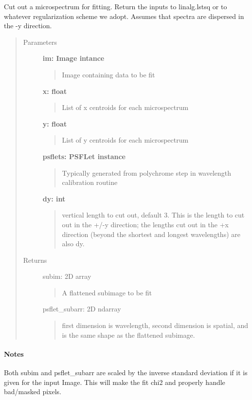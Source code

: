 \documentclass[letterpaper,10pt,english]{sphinxmanual}
\begin{document}
\begin{fulllineitems}
\label{tools:tools.reduction.get_cutout}
Cut out a microspectrum for fitting.  Return the inputs to 
linalg.lstsq or to whatever regularization scheme we adopt.
Assumes that spectra are dispersed in the -y direction.
\begin{quote}\begin{description}
\item[{Parameters}] \leavevmode
\textbf{im: Image intance}
\begin{quote}

Image containing data to be fit
\end{quote}

\textbf{x: float}
\begin{quote}

List of x centroids for each microspectrum
\end{quote}

\textbf{y: float}
\begin{quote}

List of y centroids for each microspectrum
\end{quote}

\textbf{psflets: PSFLet instance}
\begin{quote}

Typically generated from polychrome step in wavelength calibration routine
\end{quote}

\textbf{dy: int}
\begin{quote}

vertical length to cut out, default 3.  This is the length to cut out in the
+/-y direction; the lengths cut out in the +x direction (beyond the shortest 
and longest wavelengths) are also dy.
\end{quote}

\item[{Returns}] \leavevmode
subim:  2D array
\begin{quote}

A flattened subimage to be fit
\end{quote}

psflet\_subarr: 2D ndarray
\begin{quote}

first dimension is wavelength, second dimension is spatial, and is the same 
shape as the flattened subimage.
\end{quote}

\end{description}\end{quote}
\paragraph{Notes}

Both subim and psflet\_subarr are scaled by the inverse
standard deviation if it is given for the input Image.  This 
will make the fit chi2 and properly handle bad/masked pixels.

\end{fulllineitems}
\end{document}
